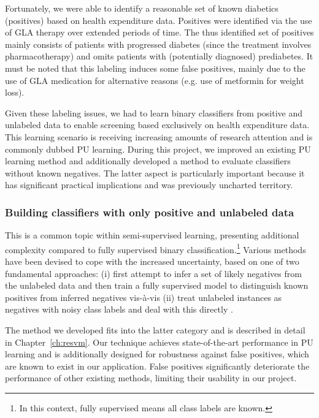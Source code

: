 Fortunately, we were able to identify a reasonable set of known diabetics (positives) based on health expenditure data. Positives were identified via the use of GLA therapy over extended periods of time. The thus identified set of positives mainly consists of patients with progressed diabetes (since the treatment involves pharmacotherapy) and omits patients with (potentially diagnosed) prediabetes. It must be noted that this labeling induces some false positives, mainly due to the use of GLA medication for alternative reasons (e.g. use of metformin for weight loss).

Given these labeling issues, we had to learn binary classifiers from positive and unlabeled data to enable screening based exclusively on health expenditure data. This learning scenario is receiving increasing amounts of research attention and is commonly dubbed PU learning. During this project, we improved an existing PU learning method and additionally developed a method to evaluate classifiers without known negatives. The latter aspect is particularly important because it has significant practical implications and was previously uncharted territory.

\subsubsection{Building classifiers with only positive and unlabeled data} 
This is a common topic within semi-supervised learning, presenting additional complexity compared to fully supervised binary classification.\footnote{In this context, fully supervised means all class labels are known.} Various methods have been devised to cope with the increased uncertainty, based on one of two fundamental approaches:
(i) first attempt to infer a set of likely negatives from the unlabeled data and then train a fully supervised model to distinguish known positives from inferred negatives \citep{liu02partially,Yu:2005:SCM:1108759.1108762,Li03learningto} vis-\`a-vis (ii) treat unlabeled instances as negatives with noisy class labels and deal with this directly \citep{Elkan:2008:LCO:1401890.1401920,Lee03learningwith,Liu:2003:BTC:951949.952139,MORDELET-2010-523336,Liu:2005:PSC:2138033.2138052}.

The method we developed fits into the latter category and is described in detail in Chapter~\ref{ch:resvm}. Our technique achieves state-of-the-art performance in PU learning and is additionally designed for robustness against false positives, which are known to exist in our application. False positives significantly deteriorate the performance of other existing methods, limiting their usability in our project.

